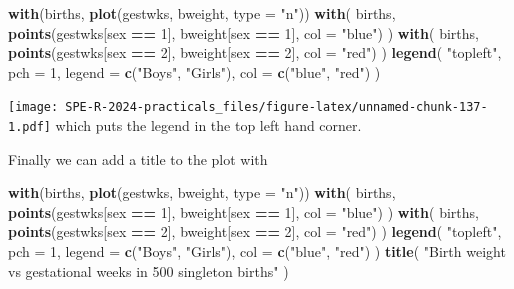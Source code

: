 \documentclass[
]{book}
\newenvironment{Shaded}{\begin{snugshade}}{\end{snugshade}}
\newcommand{\AttributeTok}[1]{\textcolor[rgb]{0.13,0.29,0.53}{#1}}
\newcommand{\DecValTok}[1]{\textcolor[rgb]{0.00,0.00,0.81}{#1}}
\newcommand{\FunctionTok}[1]{\textcolor[rgb]{0.13,0.29,0.53}{\textbf{#1}}}
\newcommand{\NormalTok}[1]{#1}
\newcommand{\SpecialCharTok}[1]{\textcolor[rgb]{0.81,0.36,0.00}{\textbf{#1}}}
\newcommand{\StringTok}[1]{\textcolor[rgb]{0.31,0.60,0.02}{#1}}
\begin{document}
\begin{Shaded}
\begin{Highlighting}[]
\FunctionTok{with}\NormalTok{(births, }\FunctionTok{plot}\NormalTok{(gestwks, bweight, }\AttributeTok{type =} \StringTok{"n"}\NormalTok{))}
\FunctionTok{with}\NormalTok{(}
\NormalTok{  births, }
  \FunctionTok{points}\NormalTok{(gestwks[sex }\SpecialCharTok{==} \DecValTok{1}\NormalTok{], bweight[sex }\SpecialCharTok{==} \DecValTok{1}\NormalTok{], }\AttributeTok{col =} \StringTok{"blue"}\NormalTok{)}
\NormalTok{)}
\FunctionTok{with}\NormalTok{(}
\NormalTok{  births, }
  \FunctionTok{points}\NormalTok{(gestwks[sex }\SpecialCharTok{==} \DecValTok{2}\NormalTok{], bweight[sex }\SpecialCharTok{==} \DecValTok{2}\NormalTok{], }\AttributeTok{col =} \StringTok{"red"}\NormalTok{)}
\NormalTok{)}
\FunctionTok{legend}\NormalTok{(}
  \StringTok{"topleft"}\NormalTok{, }
  \AttributeTok{pch =} \DecValTok{1}\NormalTok{, }
  \AttributeTok{legend =} \FunctionTok{c}\NormalTok{(}\StringTok{"Boys"}\NormalTok{, }\StringTok{"Girls"}\NormalTok{), }
  \AttributeTok{col =} \FunctionTok{c}\NormalTok{(}\StringTok{"blue"}\NormalTok{, }\StringTok{"red"}\NormalTok{)}
\NormalTok{)}
\end{Highlighting}
\end{Shaded}

\texttt{[image: SPE-R-2024-practicals\_files/figure-latex/unnamed-chunk-137-1.pdf]}
which puts the legend in the top left hand corner.

Finally we can add a title to the plot with

\begin{Shaded}
\begin{Highlighting}[]
\FunctionTok{with}\NormalTok{(births, }\FunctionTok{plot}\NormalTok{(gestwks, bweight, }\AttributeTok{type =} \StringTok{"n"}\NormalTok{))}
\FunctionTok{with}\NormalTok{(}
\NormalTok{  births, }
  \FunctionTok{points}\NormalTok{(gestwks[sex }\SpecialCharTok{==} \DecValTok{1}\NormalTok{], bweight[sex }\SpecialCharTok{==} \DecValTok{1}\NormalTok{], }\AttributeTok{col =} \StringTok{"blue"}\NormalTok{)}
\NormalTok{)}
\FunctionTok{with}\NormalTok{(}
\NormalTok{  births, }
  \FunctionTok{points}\NormalTok{(gestwks[sex }\SpecialCharTok{==} \DecValTok{2}\NormalTok{], bweight[sex }\SpecialCharTok{==} \DecValTok{2}\NormalTok{], }\AttributeTok{col =} \StringTok{"red"}\NormalTok{)}
\NormalTok{)}
\FunctionTok{legend}\NormalTok{(}
  \StringTok{"topleft"}\NormalTok{, }
  \AttributeTok{pch =} \DecValTok{1}\NormalTok{, }
  \AttributeTok{legend =} \FunctionTok{c}\NormalTok{(}\StringTok{"Boys"}\NormalTok{, }\StringTok{"Girls"}\NormalTok{), }
  \AttributeTok{col =} \FunctionTok{c}\NormalTok{(}\StringTok{"blue"}\NormalTok{, }\StringTok{"red"}\NormalTok{)}
\NormalTok{)}
\FunctionTok{title}\NormalTok{(}
  \StringTok{"Birth weight vs gestational weeks in 500 singleton births"}
\NormalTok{)}
\end{Highlighting}
\end{Shaded}
\end{document}
